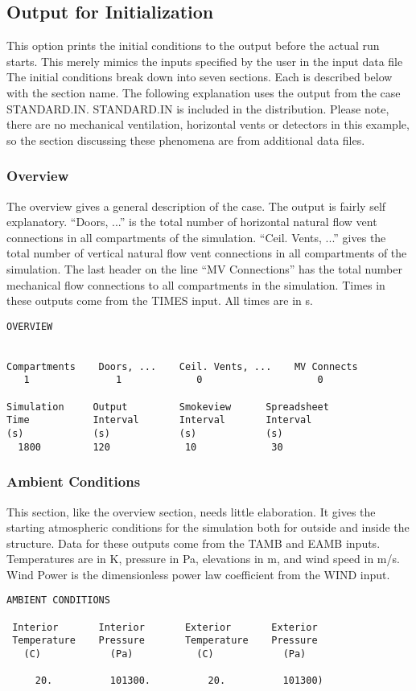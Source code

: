 \subsection{Output for Initialization}

This option prints the initial conditions to the output before the actual run starts.  This merely mimics the inputs specified by the user in the input data file  The initial conditions break down into seven sections.  Each is described below with the section name. The following explanation uses the output from the case STANDARD.IN. STANDARD.IN is included in the distribution. Please note, there are no mechanical ventilation, horizontal vents or detectors in this example, so the section discussing these phenomena are from additional data files.

\subsubsection{Overview}

The overview gives a general description of the case.  The output is fairly self explanatory. ``Doors, ...'' is the total number of horizontal natural flow vent connections in all compartments of the simulation.  ``Ceil. Vents, ...'' gives the total number of vertical natural flow vent connections in all compartments of the simulation.  The last header on the line ``MV Connections'' has the total number mechanical flow connections to all compartments in the simulation. Times in these outputs come from the TIMES input. All times are in s.
\begin{lstlisting}[basicstyle=\scriptsize]
 OVERVIEW


Compartments    Doors, ...    Ceil. Vents, ...    MV Connects
   1               1             0                    0

Simulation     Output         Smokeview      Spreadsheet
Time           Interval       Interval       Interval
(s)            (s)            (s)            (s)
  1800         120             10             30
\end{lstlisting}

\subsubsection{Ambient Conditions}

This section, like the overview section, needs little elaboration.  It gives the starting atmospheric conditions for the simulation both for outside and inside the structure. Data for these outputs come from the TAMB and EAMB inputs. Temperatures are in K, pressure in Pa, elevations in m, and wind speed in m/s. Wind Power is the dimensionless power law coefficient from the WIND input.
\begin{lstlisting}[basicstyle=\scriptsize]
 AMBIENT CONDITIONS

 Interior       Interior       Exterior       Exterior
 Temperature    Pressure       Temperature    Pressure
   (C)            (Pa)           (C)            (Pa)

     20.          101300.          20.          101300)
\end{lstlisting}

